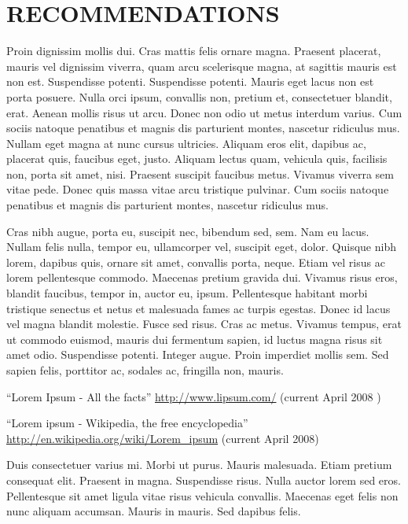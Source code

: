 \documentclass[12pt]{article}
\begin{document}
\section{RECOMMENDATIONS}
Proin dignissim mollis dui. Cras mattis felis ornare magna. Praesent placerat, mauris vel dignissim viverra, quam arcu scelerisque magna, at sagittis mauris est non est. Suspendisse potenti. Suspendisse potenti. Mauris eget lacus non est porta posuere. Nulla orci ipsum, convallis non, pretium et, consectetuer blandit, erat. Aenean mollis risus ut arcu. Donec non odio ut metus interdum varius. Cum sociis natoque penatibus et magnis dis parturient montes, nascetur ridiculus mus. Nullam eget magna at nunc cursus ultricies. Aliquam eros elit, dapibus ac, placerat quis, faucibus eget, justo. Aliquam lectus quam, vehicula quis, facilisis non, porta sit amet, nisi. Praesent suscipit faucibus metus. Vivamus viverra sem vitae pede. Donec quis massa vitae arcu tristique pulvinar. Cum sociis natoque penatibus et magnis dis parturient montes, nascetur ridiculus mus.

Cras nibh augue, porta eu, suscipit nec, bibendum sed, sem. Nam eu lacus. Nullam felis nulla, tempor eu, ullamcorper vel, suscipit eget, dolor. Quisque nibh lorem, dapibus quis, ornare sit amet, convallis porta, neque. Etiam vel risus ac lorem pellentesque commodo. Maecenas pretium gravida dui. Vivamus risus eros, blandit faucibus, tempor in, auctor eu, ipsum. Pellentesque habitant morbi tristique senectus et netus et malesuada fames ac turpis egestas. Donec id lacus vel magna blandit molestie. Fusce sed risus. Cras ac metus. Vivamus tempus, erat ut commodo euismod, mauris dui fermentum sapien, id luctus magna risus sit amet odio. Suspendisse potenti. Integer augue. Proin imperdiet mollis sem. Sed sapien felis, porttitor ac, sodales ac, fringilla non, mauris.


\newpage
{}
\begin{thebibliography}{9}


``Lorem Ipsum - All the facts'' \url{http://www.lipsum.com/} (current April 2008 )

``Lorem ipsum - Wikipedia, the free encyclopedia'' \url{http://en.wikipedia.org/wiki/Lorem_ipsum} (current April 2008)

\end{thebibliography}
\newpage

Duis consectetuer varius mi. Morbi ut purus. Mauris malesuada. Etiam pretium consequat elit. Praesent in magna. Suspendisse risus. Nulla auctor lorem sed eros. Pellentesque sit amet ligula vitae risus vehicula convallis. Maecenas eget felis non nunc aliquam accumsan. Mauris in mauris. Sed dapibus felis.
\end{document}
